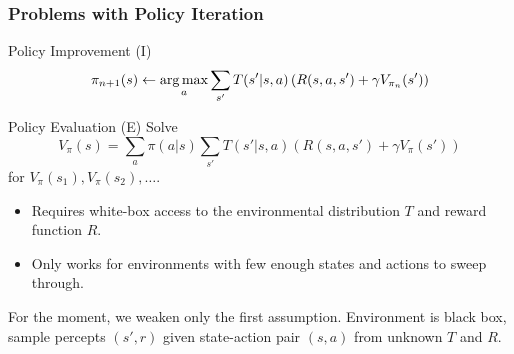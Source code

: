 \begin{frame}
    \frametitle{Problems with Policy Iteration}
    
    \begin{block}{Policy Improvement (I)}
        $$
        \pi_{n+1}(s) \leftarrow \operatorname*{arg\,max}_a \sum_{s'} T(s' | s,a) 
        \left( R(s,a,s') + \gamma V_{\pi_n}(s') \right)
        $$
    \end{block}
    
    \begin{block}{Policy Evaluation (E)}
        Solve
        $$
        V_\pi(s) = \sum_{a} \pi(a | s) \sum_{s'} T(s' | s, a) \left( R(s,a,s') + \gamma V_\pi(s') \right) 
        $$ for $V_\pi(s_1), V_\pi(s_2), \ldots$.
    \end{block}
    
    \begin{itemize}
        \item Requires white-box access to the environmental distribution $T$
        and reward function $R$.
        \item Only works for environments with few enough states and actions
        to sweep through.
    \end{itemize}
    \pause
    For the moment, we weaken only the first assumption. Environment
    is black box, sample percepts $(s',r)$ given state-action pair $(s,a)$ from unknown
	$T$ and $R$.
    
\end{frame}


